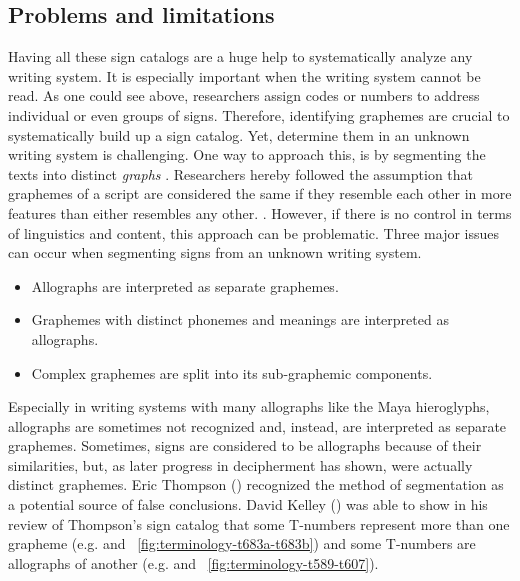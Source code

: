 \documentclass[../main.tex]{subfiles}
\begin{document}
\subsection{Problems and limitations}
Having all these sign catalogs are a huge help to systematically analyze any writing system.
It is especially important when the writing system cannot be read.
As one could see above, researchers assign codes or numbers to address individual or 
even groups of signs.
Therefore, identifying graphemes are crucial to systematically build up a sign catalog.
Yet, determine them in an unknown writing system is challenging.
One way to approach this, is by segmenting the texts into distinct \emph{graphs} .
Researchers hereby followed the assumption that graphemes of a script are considered the same if 
they resemble each other in more features than either resembles any other.
.
However, if there is no control in terms of linguistics and content, 
this approach can be problematic.
Three major issues can occur when segmenting signs from an unknown writing system.
\begin{itemize}
    \item Allographs are interpreted as separate graphemes.
    \item Graphemes with distinct phonemes and meanings are interpreted as allographs.
    \item Complex graphemes are split into its sub-graphemic components.
\end{itemize}
Especially in writing systems with many allographs like the Maya hieroglyphs,
allographs are sometimes not recognized and, instead, are interpreted as separate graphemes. 
Sometimes, signs are considered to be allographs because of their similarities, 
but, as later progress in decipherment has shown, were actually distinct graphemes.
Eric Thompson (\cite[12\psq]{thompson1962catalog}) recognized the method of segmentation as 
a potential source of false conclusions.
David Kelley (\cite{kelley1962}) was able to show in his review of Thompson's sign catalog that
some T-numbers represent more than one grapheme 
(e.g.  and ~\ref{fig:terminology-t683a-t683b}) 
and some T-numbers are allographs of another 
(e.g.  and ~\ref{fig:terminology-t589-t607}).
\end{document}
